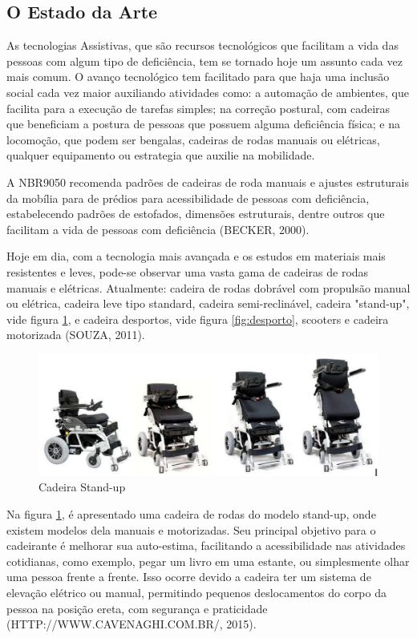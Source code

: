 \subsection{O Estado da Arte}

As tecnologias Assistivas, que são recursos tecnológicos que facilitam a vida das pessoas com algum tipo de deficiência, tem se tornado hoje um assunto cada vez mais comum. O avanço tecnológico tem facilitado para que haja uma inclusão social cada vez maior auxiliando atividades como: a automação de ambientes, que facilita para a execução de tarefas simples; na correção postural, com cadeiras que beneficiam a postura de pessoas que possuem alguma deficiência física; e na locomoção, que podem ser bengalas, cadeiras de rodas manuais ou elétricas, qualquer equipamento ou estrategia que auxilie na mobilidade.

A NBR9050 recomenda padrões de cadeiras de roda manuais e ajustes estruturais da mobília para de prédios para acessibilidade de pessoas com deficiência, estabelecendo padrões de estofados, dimensões estruturais, dentre outros que facilitam a vida de pessoas com deficiência (BECKER, 2000).

Hoje em dia, com a tecnologia mais avançada e os estudos em materiais mais resistentes e leves, pode-se observar uma vasta gama de cadeiras de rodas manuais e elétricas. Atualmente: cadeira de rodas dobrável com propulsão manual ou elétrica, cadeira leve tipo standard, cadeira semi-reclinável, cadeira "stand-up", vide figura \ref{fig:stand_up}, e cadeira desportos, vide figura \ref{fig:desporto}, scooters e cadeira motorizada (SOUZA, 2011).

\begin{figure}[!htb]
  \centering
  \includegraphics[keepaspectratio=true,scale=0.50]{figuras/introducao/versoes}
  \caption{Cadeira Stand-up}
  \label{fig:stand_up}
\end{figure}


Na figura \ref{fig:stand_up}, é apresentado uma cadeira de rodas do modelo stand-up, onde existem modelos dela manuais e motorizadas. Seu principal objetivo para o cadeirante é melhorar sua auto-estima, facilitando a acessibilidade nas atividades cotidianas, como exemplo, pegar um livro em uma estante, ou simplesmente olhar uma pessoa frente a frente. Isso ocorre devido a cadeira ter um sistema de elevação elétrico ou manual, permitindo pequenos deslocamentos do corpo da pessoa na posição ereta, com segurança e praticidade (HTTP://WWW.CAVENAGHI.COM.BR/, 2015).

